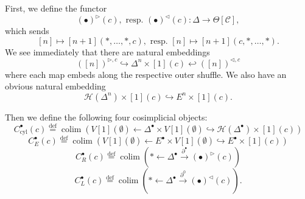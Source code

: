 \documentclass[leqno]{article}
\numberwithin{equation}{subsection}
\theoremstyle{plain}   %
\theoremstyle{remark}
\theoremstyle{plain}
\DeclareMathOperator{\colim}{colim}
\renewcommand{\C}{\ensuremath{\mathcal{C}}}
\newcommand{\defeq}{\overset{\mathrm{def}}=}
\begin{document}
First, we define the functor
\[(\bullet)^{\triangleright}(c),\text{ resp. }(\bullet)^{\triangleleft}(c): \Delta \to \Theta[\C],\]
which sends
\[[n]\mapsto [n+1](\ast,\dots,\ast,c), \text{ resp. } [n]\mapsto [n+1](c,\ast,\dots,\ast).\]
We see immediately that there are natural embeddings
\[([n])^{\triangleright,c} \hookrightarrow \Delta^n \times [1](c)  \hookleftarrow ([n])^{\triangleleft,c}\]
where each map embeds along the respective outer shuffle. We also have an obvious natural embedding
\[\mathscr{H}(\Delta^n)\times [1](c) \hookrightarrow E^n\times [1](c).\]

Then we define the following four cosimplicial objects:
\[C^\bullet_{\mathrm{cyl}}(c)\defeq \colim \left( V[1](\emptyset) \leftarrow \Delta^\bullet \times V[1](\emptyset) \hookrightarrow \mathscr{H}(\Delta^\bullet)\times [1](c)\right)\]
\[C^\bullet_{E}(c)\defeq \colim \left( V[1](\emptyset) \leftarrow E^\bullet \times V[1](\emptyset) \hookrightarrow E^\bullet\times [1](c)\right)\]
\[C^\bullet_{R}(c)\defeq \colim \left( \ast \leftarrow \Delta^\bullet \xrightarrow{\partial^{\bullet}} (\bullet)^\triangleright(c)\right)\]
\[C^\bullet_{L}(c)\defeq \colim \left( \ast \leftarrow \Delta^\bullet \xrightarrow{\partial^0} (\bullet)^\triangleleft(c)\right).\]
\end{document}
